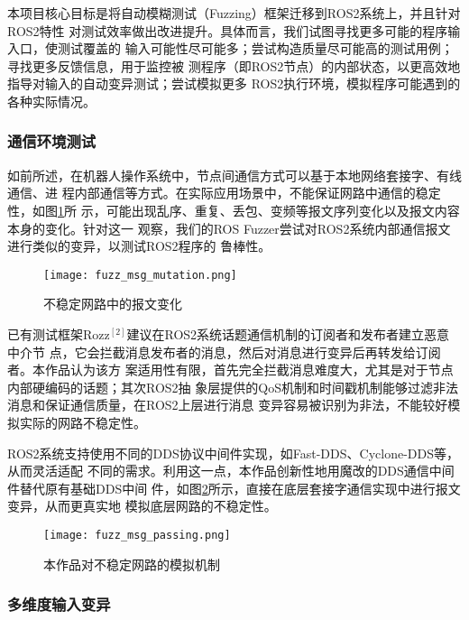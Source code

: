 本项目核心目标是将自动模糊测试（Fuzzing）框架迁移到ROS2系统上，并且针对ROS2特性
对测试效率做出改进提升。具体而言，我们试图寻找更多可能的程序输入口，使测试覆盖的
输入可能性尽可能多；尝试构造质量尽可能高的测试用例；寻找更多反馈信息，用于监控被
测程序（即ROS2节点）的内部状态，以更高效地指导对输入的自动变异测试；尝试模拟更多
ROS2执行环境，模拟程序可能遇到的各种实际情况。

\subsubsection{通信环境测试}

如前所述，在机器人操作系统中，节点间通信方式可以基于本地网络套接字、有线通信、进
程内部通信等方式。在实际应用场景中，不能保证网路中通信的稳定性，如图\ref{pic:fmm}所
示，可能出现乱序、重复、丢包、变频等报文序列变化以及报文内容本身的变化。针对这一
观察，我们的ROS Fuzzer尝试对ROS2系统内部通信报文进行类似的变异，以测试ROS2程序的
鲁棒性。

\begin{figure}[h]
    \centering
    \texttt{[image: fuzz\_msg\_mutation.png]}
    \caption{不稳定网路中的报文变化}
    \label{pic:fmm}
\end{figure}

已有测试框架Rozz$^{[2]}$建议在ROS2系统话题通信机制的订阅者和发布者建立恶意中介节
点，它会拦截消息发布者的消息，然后对消息进行变异后再转发给订阅者。本作品认为该方
案适用性有限，首先完全拦截消息难度大，尤其是对于节点内部硬编码的话题；其次ROS2抽
象层提供的QoS机制和时间戳机制能够过滤非法消息和保证通信质量，在ROS2上层进行消息
变异容易被识别为非法，不能较好模拟实际的网路不稳定性。

ROS2系统支持使用不同的DDS协议中间件实现，如Fast-DDS、Cyclone-DDS等，从而灵活适配
不同的需求。利用这一点，本作品创新性地用魔改的DDS通信中间件替代原有基础DDS中间
件，如图\ref{pic:fmp}所示，直接在底层套接字通信实现中进行报文变异，从而更真实地
模拟底层网路的不稳定性。

\begin{figure}[h]
    \centering
    \texttt{[image: fuzz\_msg\_passing.png]}
    \caption{本作品对不稳定网路的模拟机制}
    \label{pic:fmp}
\end{figure}

\subsubsection{多维度输入变异}

